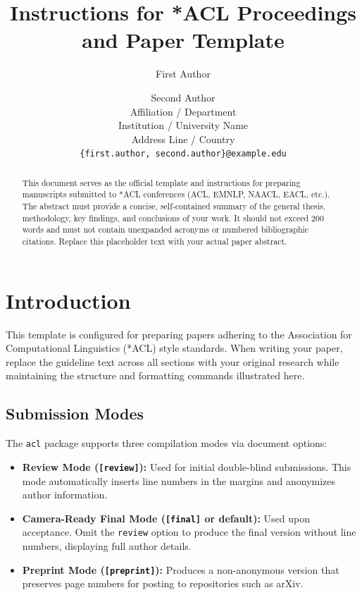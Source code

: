\documentclass[11pt]{article}
\title{Instructions for *ACL Proceedings and Paper Template}
\author{First Author \and Second Author \\
  Affiliation / Department \\
  Institution / University Name \\
  Address Line / Country \\
  \texttt{\{first.author, second.author\}@example.edu}}
\begin{document}
\maketitle

\begin{abstract}
This document serves as the official template and instructions for preparing manuscripts submitted to *ACL conferences (ACL, EMNLP, NAACL, EACL, etc.). The abstract must provide a concise, self-contained summary of the general thesis, methodology, key findings, and conclusions of your work. It should not exceed 200 words and must not contain unexpanded acronyms or numbered bibliographic citations. Replace this placeholder text with your actual paper abstract.
\end{abstract}

\section{Introduction}
\label{sec:intro}

This template is configured for preparing papers adhering to the Association for Computational Linguistics (*ACL) style standards. When writing your paper, replace the guideline text across all sections with your original research while maintaining the structure and formatting commands illustrated here.

\subsection{Submission Modes}
The \texttt{acl} package supports three compilation modes via document options:
\begin{itemize}
    \item \textbf{Review Mode (\texttt{[review]}):} Used for initial double-blind submissions. This mode automatically inserts line numbers in the margins and anonymizes author information.
    \item \textbf{Camera-Ready Final Mode (\texttt{[final]} or default):} Used upon acceptance. Omit the \texttt{review} option to produce the final version without line numbers, displaying full author details.
    \item \textbf{Preprint Mode (\texttt{[preprint]}):} Produces a non-anonymous version that preserves page numbers for posting to repositories such as arXiv.
\end{itemize}
\end{document}
